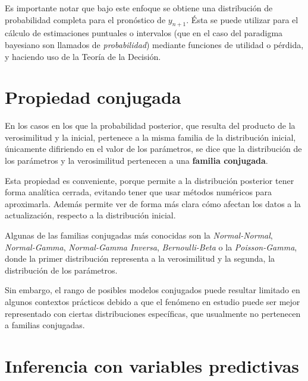 Es importante notar que bajo este enfoque se obtiene una distribuci\'on de probabilidad completa para  el pron\'ostico de $y_{n+1}$. \'Esta se puede utilizar para el c\'alculo de estimaciones puntuales o intervalos (que en el caso del paradigma bayesiano son llamados de \textit{probabilidad}) mediante funciones de utilidad o p\'erdida, y haciendo uso de la Teor\'ia de la Decisi\'on.

\section{Propiedad conjugada}

En los casos en los que la probabilidad posterior, que resulta del producto de la verosimilitud y la inicial, pertenece a la misma familia de la distribuci\'on inicial, \'unicamente difiriendo en el valor de los par\'ametros, se dice que la distribuci\'on de los par\'ametros y la verosimilitud pertenecen a una \textbf{familia conjugada}.

Esta propiedad es conveniente, porque permite a la distribuci\'on posterior tener forma anal\'itica cerrada, evitando tener que usar m\'etodos num\'ericos para aproximarla. Adem\'as permite ver de forma m\'as clara c\'omo afectan los datos a la actualizaci\'on, respecto a la distribuci\'on inicial.

Algunas de las familias conjugadas m\'as conocidas son la \textit{Normal-Normal}, \textit{Normal-Gamma}, \textit{Normal-Gamma Inversa}, \textit{Bernoulli-Beta} o la \textit{Poisson-Gamma}, donde la primer distribuci\'on representa a la verosimilitud y la segunda, la distribuci\'on de los par\'ametros. 

Sin embargo, el rango de posibles modelos conjugados puede resultar limitado en algunos contextos pr\'acticos debido a que el fen\'omeno en estudio puede ser mejor representado con ciertas distribuciones espec\'ificas, que usualmente no pertenecen a familias conjugadas.

\section[Inferencia con variables predictivas]{Inferencia con variables predictivas\raisebox{.3\baselineskip}{\normalsize\footnotemark}}

